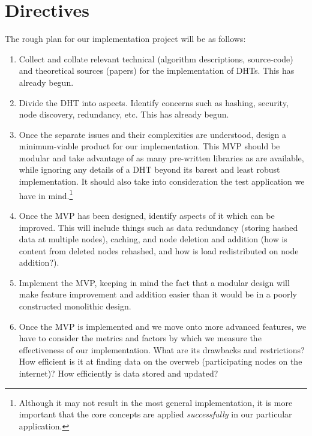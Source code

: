 \documentclass[12pt]{report}
\begin{document}
    \section{Directives}
    The rough plan for our implementation project will be as follows:
    \begin{enumerate}
        \item Collect and collate relevant technical (algorithm descriptions,
            source-code) and theoretical sources (papers) for the implementation
            of DHTs.  This has already begun.
        \item Divide the DHT into aspects.  Identify concerns such as hashing,
            security, node discovery, redundancy, etc.  This has already begun.
        \item Once the separate issues and their complexities are understood,
            design a minimum-viable product for our implementation.  This MVP
            should be modular and take advantage of as many pre-written
            libraries as are available, while ignoring any details of a DHT
            beyond its barest and least robust implementation.  It should also
            take into consideration the test application we have in
            mind.\footnote{Although it may not result in the most general
            implementation, it is more important that the core concepts are
            applied \textit{successfully} in our particular application.}
        \item Once the MVP has been designed, identify aspects of it which can
            be improved.  This will include things such as data redundancy
            (storing hashed data at multiple nodes), caching, and node
            deletion and addition (how is content from deleted nodes rehashed,
            and how is load redistributed on node addition?).
        \item Implement the MVP, keeping in mind the fact that a
            modular design will make feature improvement and addition easier
            than it would be in a poorly constructed monolithic design.
        \item Once the MVP is implemented and we move onto more advanced
            features, we have to consider the metrics and factors by which we
            measure the effectiveness of our implementation.  What are its
            drawbacks and restrictions?  How efficient is it at finding data on
            the overweb (participating nodes on the internet)?  How efficiently is
            data stored and updated?
    \end{enumerate}
\end{document}
